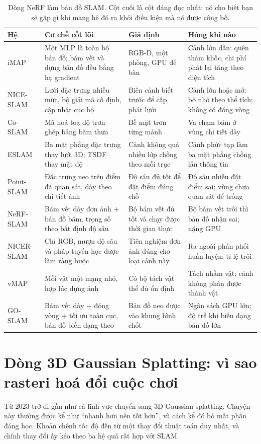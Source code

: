\documentclass[../../deep_learning.tex]{subfiles}
\begin{document}
\begin{table}[H]\centering\footnotesize
\caption{Dòng NeRF làm bản đồ SLAM. Cột cuối là cột đáng đọc nhất: nó cho biết bạn sẽ gặp gì khi mang hệ đó ra khỏi điều kiện mà nó được công bố.}
\label{tab:f32-nerf-line}
\begin{tabularx}{\linewidth}{@{}L{2.15cm}YL{2.5cm}L{3.5cm}@{}}
\toprule
\textbf{Hệ} & \textbf{Cơ chế cốt lõi} & \textbf{Giả định} & \textbf{Hỏng khi nào}\\
\midrule
iMAP & Một MLP là toàn bộ bản đồ; bám vết và dựng bản đồ đều bằng hạ gradient & RGB-D, một phòng, GPU để bàn & Cảnh lớn dần: quên thảm khốc, chi phí phát lại tăng theo diện tích\\
NICE-SLAM & Lưới đặc trưng nhiều mức, bộ giải mã cố định, cập nhật cục bộ & Biên cảnh biết trước để cấp phát lưới & Cảnh lớn hoặc mở: bộ nhớ theo thể tích; không có đóng vòng\\
Co-SLAM & Mã hoá toạ độ trơn ghép bảng băm thưa & Bề mặt trơn từng mảnh & Va chạm băm ở vùng chi tiết dày\\
ESLAM & Ba mặt phẳng đặc trưng thay lưới 3D; TSDF thay mật độ & Cảnh không quá nhiều lớp chồng theo mỗi trục & Cảnh phức tạp làm ba mặt phẳng chồng lấn thông tin\\
Point-SLAM & Đặc trưng neo trên điểm đã quan sát, dày theo chi tiết ảnh & Độ sâu đủ tốt để đặt điểm đúng chỗ & Độ sâu nhiễu đặt điểm sai; vùng chưa quan sát để trống\\
NeRF-SLAM & Bám vết dày đơn ảnh \(+\) bản đồ băm, trọng số theo bất định độ sâu & Bộ bám vết đủ tốt và chạy được thời gian thực & Bộ bám vết trôi thì bản đồ nhận sai; nặng GPU\\
NICER-SLAM & Chỉ RGB, mượn độ sâu và pháp tuyến học được làm ràng buộc & Tiên nghiệm đơn ảnh đúng cho loại cảnh này & Ra ngoài phân phối huấn luyện; tỉ lệ trôi\\
vMAP & Mỗi vật một mạng nhỏ, hợp lúc dựng ảnh & Có bộ tách vật thể đủ ổn định & Tách nhầm vật; cảnh không phân được thành vật\\
GO-SLAM & Bám vết dày \(+\) đóng vòng \(+\) tối ưu toàn cục, bản đồ biến dạng theo & Bản đồ neo được vào khung hình chốt & Ngân sách GPU lớn; độ trễ khi biến dạng bản đồ lớn\\
\bottomrule
\end{tabularx}
\end{table}

\section{Dòng 3D Gaussian Splatting: vì sao rasteri hoá đổi cuộc chơi}
Từ 2023 trở đi gần như cả lĩnh vực chuyển sang 3D Gaussian splatting. Chuyện này thường được kể như ``nhanh hơn nên tốt hơn'', và cách kể đó bỏ mất phần đáng học. Khoản chênh tốc độ đến từ một thay đổi thuật toán duy nhất, và chính thay đổi ấy kéo theo ba hệ quả rất hợp với SLAM.
\end{document}

